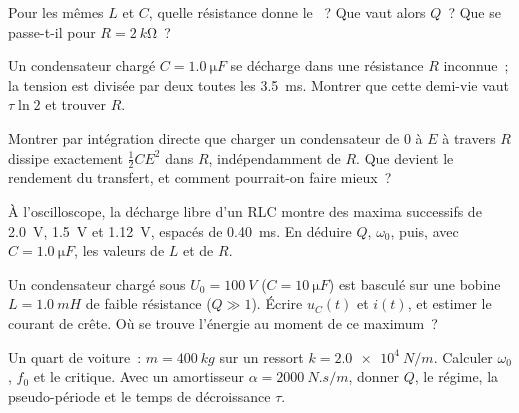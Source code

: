 \begin{exercise}[$\star$]\label{exo:b1:transient-regimes:4}
Pour les mêmes $L$ et $C$, quelle résistance donne le ~?
Que vaut alors $Q$~? Que se passe-t-il pour $R = \qty{2}{k\ohm}$~?
\end{exercise}

\begin{exercise}[$\star\star$]\label{exo:b1:transient-regimes:5}
Un condensateur chargé $C = \qty{1.0}{\micro F}$ se décharge dans une
résistance $R$ inconnue~; la tension est divisée par deux toutes les
\qty{3.5}{ms}. Montrer que cette demi-vie vaut $\tau\ln 2$ et trouver $R$.
\end{exercise}

\begin{exercise}[$\star\star$]\label{exo:b1:transient-regimes:6}
Montrer par intégration directe que charger un condensateur de $0$ à $E$
à travers $R$ dissipe exactement $\tfrac12 CE^2$ dans $R$, indépendamment
de $R$. Que devient le rendement du transfert, et comment pourrait-on
faire mieux~?
\end{exercise}

\begin{exercise}[$\star\star$]\label{exo:b1:transient-regimes:7}
À l'oscilloscope, la décharge libre d'un RLC montre des maxima successifs
de \qty{2.0}{V}, \qty{1.5}{V} et \qty{1.12}{V}, espacés de \qty{0.40}{ms}.
En déduire $Q$, $\omega_0$, puis, avec $C = \qty{1.0}{\micro F}$, les
valeurs de $L$ et de $R$.
\end{exercise}

\begin{exercise}[$\star\star$]\label{exo:b1:transient-regimes:8}
Un condensateur chargé sous $U_0 = \qty{100}{V}$ ($C = \qty{10}{\micro F}$)
est basculé sur une bobine $L = \qty{1.0}{mH}$ de faible résistance
($Q \gg 1$). Écrire $u_C(t)$ et $i(t)$, et estimer le courant de crête.
Où se trouve l'énergie au moment de ce maximum~?
\end{exercise}

\begin{exercise}[$\star\star$]\label{exo:b1:transient-regimes:9}
Un quart de voiture~: $m = \qty{400}{kg}$ sur un ressort $k = \qty{2.0e4}{N/m}$.
Calculer $\omega_0$, $f_0$ et le  critique.
Avec un amortisseur $\alpha = \qty{2000}{N.s/m}$, donner $Q$, le régime,
la pseudo-période et le temps de décroissance $\tau$.
\end{exercise}

